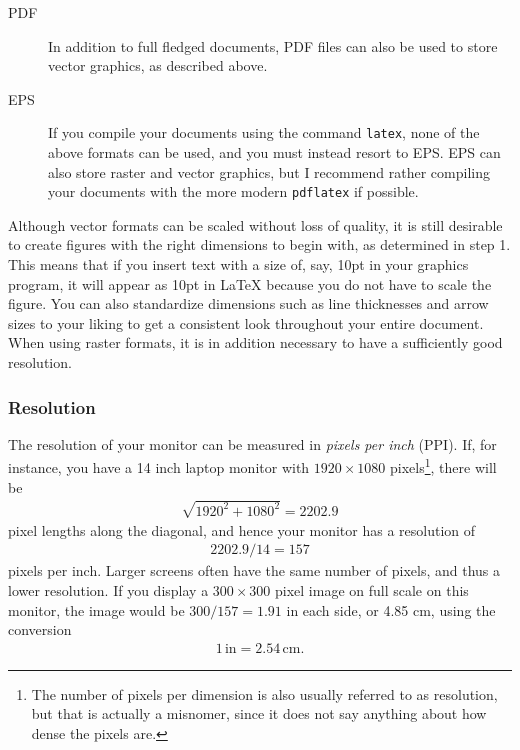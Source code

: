 \documentclass[a4paper,twocolumn]{article}
\begin{document}
\begin{description}
    \item[PDF] In addition to full fledged documents, PDF files can also be used to store vector graphics, as described above.
    \item[EPS] If you compile your documents using the command \verb|latex|, none of the above formats can be used, and you must instead resort to EPS. EPS can also store raster and vector graphics, but I recommend rather compiling your documents with the more modern \verb|pdflatex| if possible.
\end{description}

Although vector formats can be scaled without loss of quality, it is still desirable to create figures with the right dimensions to begin with, as determined in step 1. This means that if you insert text with a size of, say, 10pt in your graphics program, it will appear as 10pt in \LaTeX{} because you do not have to scale the figure. You can also standardize dimensions such as line thicknesses and arrow sizes to your liking to get a consistent look throughout your entire document.
When using raster formats, it is in addition necessary to have a sufficiently good resolution.

\subsubsection{Resolution}
The resolution of your monitor can be measured in \emph{pixels per inch} (PPI). If, for instance, you have a 14 inch laptop monitor with $1920\times1080$ pixels\footnote{The number of pixels per dimension is also usually referred to as resolution, but that is actually a misnomer, since it does not say anything about how dense the pixels are.}, there will be
\begin{align}
    \sqrt{1920^2+1080^2}=2202.9
\end{align}
pixel lengths along the diagonal, and hence your monitor has a resolution of
\begin{align}
    2202.9 / 14 = 157
\end{align}
pixels per inch. Larger screens often have the same number of pixels, and thus a lower resolution. If you display a $300\times300$ pixel image on full scale on this monitor, the image would be $300/157=1.91$ in each side, or 4.85 cm, using the conversion 
\begin{align}
    1\,\text{in} = 2.54\,\text{cm}.
\end{align}
\end{document}
